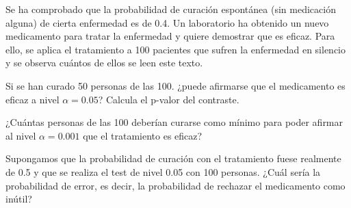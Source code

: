 \begin{problem}[7]
Se ha comprobado que la probabilidad de curación espontánea (sin medicación alguna) de cierta enfermedad es de 0.4. Un laboratorio ha obtenido un nuevo medicamento para tratar la enfermedad y quiere demostrar que es eficaz. Para ello, se aplica el tratamiento a 100 pacientes que sufren la enfermedad en silencio y se observa cuántos de ellos se leen este texto.

\ppart Si se han curado 50 personas de las 100. ¿puede afirmarse que el medicamento es eficaz a nivel $\alpha = 0.05$? Calcula el p-valor del contraste.

\ppart ¿Cuántas personas de las 100 deberían curarse como mínimo para poder afirmar al nivel $\alpha = 0.001$ que el tratamiento es eficaz?

\ppart Supongamos que la probabilidad de curación con el tratamiento fuese realmente de 0.5 y que se realiza el test de nivel 0.05 con 100 personas. ¿Cuál sería la probabilidad de error, es decir, la probabilidad de rechazar el medicamento como inútil?

\solution

\end{problem}



